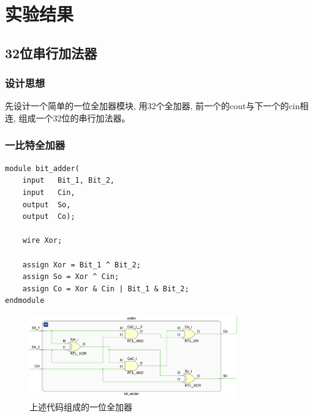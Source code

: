 \documentclass[AutoFakeBold]{LZUThesis}
\begin{document}
\chapter{实验结果}
\section{32位串行加法器}
    \subsection{设计思想}
    先设计一个简单的一位全加器模块, 用32个全加器, 前一个的cout与下一个的cin相连, 组成一个32位的串行加法器。
    \subsection{一比特全加器}
    \lstset{language=verilog}
    \begin{lstlisting}
module bit_adder(
    input   Bit_1, Bit_2,
    input   Cin,
    output  So,
    output  Co);

    wire Xor;

    assign Xor = Bit_1 ^ Bit_2;
    assign So = Xor ^ Cin;
    assign Co = Xor & Cin | Bit_1 & Bit_2;
endmodule
    \end{lstlisting}

    \begin{figure}[htbp]
        \centering
        \includegraphics[width=0.8\textwidth]{./img/bitadder}
        \caption{上述代码组成的一位全加器}
    \end{figure}
\end{document}
